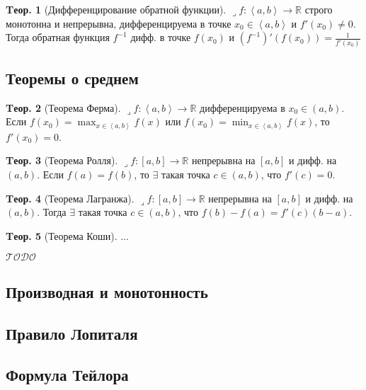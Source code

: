 \documentclass[a4paper,12pt]{article}
\numberwithin{figure}{section}
\theoremstyle{definition}
\theoremstyle{definition}
\newtheorem{theorem}{Tеор.}[section]
\def\DS{\displaystyle}
\def\RR{\mathbb{R}}
\def\on{\!:}
\def\intab{\left<a,b\right>}
\def\lets{{\huge$\lrcorner$}\space}
\def\todo{\guillemotleft$\mathcal{TODO}$\guillemotright\textellipsis}
\begin{document}
\begin{theorem}[Дифференцирование обратной функции]
	\lets $f\on\intab\to\RR$ строго монотонна и непрерывна,
	дифференцируема в точке $x_0 \in\intab$ и $f'(x_0) \ne 0$. \\
	Тогда обратная функция $f^{-1}$ дифф. в точке $f(x_0)$ и
	$\DS \left(f^{-1}\right)'\left(f(x_0)\right) = \frac1{f'(x_0)}$
\end{theorem}


\subsection{Теоремы о среднем}

\begin{theorem}[Теорема Ферма]
	\lets $f\on\intab\to\RR$ дифференцируема в $x_0\in(a,b)$.
	Если $\DS f(x_0)=\max_{x\in\intab}f(x)$ или $f(x_0)=\min_{x\in\intab}f(x)$,
	то $f'(x_0)=0$.
\end{theorem}
\bigskip


\begin{theorem}[Теорема Ролля]
	\lets $f\on[a,b]\to\RR$ непрерывна на $[a,b]$ и дифф. на $(a,b)$.
	Если $f(a)=f(b)$, то $\exists$ такая точка $c\in(a,b)$, что $f'(c)=0$.
\end{theorem}
\bigskip


\begin{theorem}[Теорема Лагранжа]
	\lets $f\on[a,b]\to\RR$ непрерывна на $[a,b]$ и дифф. на $(a,b)$.
	Тогда $\exists$ такая точка $c\in(a,b)$, что $f(b)-f(a)=f'(c)(b-a)$.
\end{theorem}
\bigskip


\begin{theorem}[Теорема Коши]
	...
\end{theorem}

\todo


\subsection{Производная и монотонность}


\subsection{Правило Лопиталя}


\subsection{Формула Тейлора}
\end{document}
